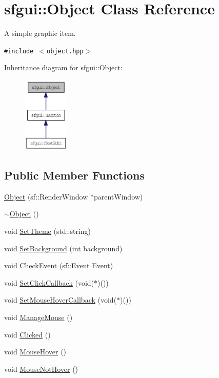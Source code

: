 \hypertarget{classsfgui_1_1Object}{
\section{sfgui::Object Class Reference}
\label{classsfgui_1_1Object}
}
A simple graphic item.  


{\tt \#include $<$object.hpp$>$}

Inheritance diagram for sfgui::Object:\nopagebreak
\begin{figure}[H]
\begin{center}
\leavevmode
\includegraphics[width=62pt]{classsfgui_1_1Object__inherit__graph}
\end{center}
\end{figure}
\subsection*{Public Member Functions}
\begin{CompactItemize}
\item 
\hyperlink{classsfgui_1_1Object_f03d0a10a3f8f71c58f56cf896e95f82}{Object} (sf::RenderWindow $\ast$parentWindow)
\item 
\hyperlink{classsfgui_1_1Object_7d923592a63a854c77ce4edcb21e40ba}{$\sim$Object} ()
\item 
void \hyperlink{classsfgui_1_1Object_96e00c4db6358d27ad806c0053e343a1}{SetTheme} (std::string)
\item 
void \hyperlink{classsfgui_1_1Object_b3477443fde0d86be5e32f5c1dcd7b01}{SetBackground} (int background)
\item 
void \hyperlink{classsfgui_1_1Object_cd9dbf2abe79e04c22f281bccb8bdb0e}{CheckEvent} (sf::Event Event)
\item 
void \hyperlink{classsfgui_1_1Object_d3d20a4cccde599748db724236ca0826}{SetClickCallback} (void($\ast$)())
\item 
void \hyperlink{classsfgui_1_1Object_8317dbdf44797dd69de490d4b946ed83}{SetMouseHoverCallback} (void($\ast$)())
\item 
void \hyperlink{classsfgui_1_1Object_3332575d988f9eee589f57b2ad516593}{ManageMouse} ()
\item 
void \hyperlink{classsfgui_1_1Object_da7f84701d318ce93fe59cc2f571eaf2}{Clicked} ()
\item 
void \hyperlink{classsfgui_1_1Object_68d1941ad05b3d0bdf2ba85702c04cc0}{MouseHover} ()
\item 
void \hyperlink{classsfgui_1_1Object_24575661efb4ab88be76eb2e1a4947e6}{MouseNotHover} ()
\end{CompactItemize}
